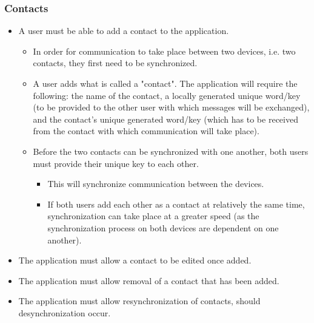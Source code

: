 \subsubsection{Contacts}
\begin{itemize}
\item A user must be able to add a contact to the application.
\begin{itemize}
\item In order for communication to take place between two devices, i.e. two contacts, they first need to be synchronized.
\item A user adds what is called a "contact". The application will require the following: the name of the contact, a locally generated unique word/key (to be provided to the other user with which messages will be exchanged), and the contact's unique generated word/key (which has to be received from the contact with which communication will take place).
\item Before the two contacts can be synchronized with one another, both users must provide their unique key to each other. 
\begin {itemize}
\item This will synchronize communication between the devices.
\item If both users add each other as a contact at relatively the same time, synchronization can take place at a greater speed (as the synchronization process on both devices are dependent on one another).
\end {itemize}
\end{itemize}
\item The application must allow a contact to be edited once added.
\item The application must allow removal of a contact that has been added.
\item The application must allow resynchronization of contacts, should desynchronization occur.
\end{itemize}

